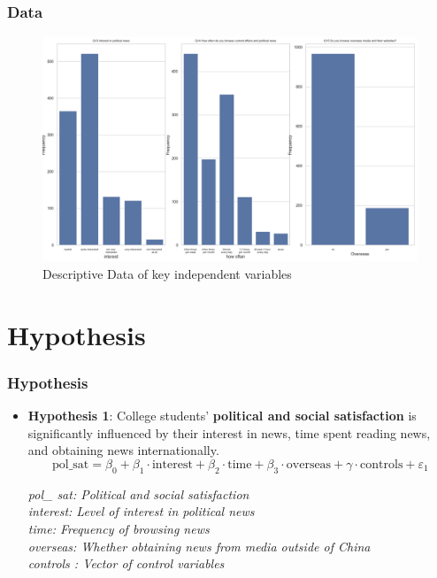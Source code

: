 \documentclass{beamer}
\begin{document}
\begin{frame}
\frametitle{Data}

\begin{figure}
  \centering
  \includegraphics[width=0.8\linewidth]{Distribution2.jpg}
  \caption{Descriptive Data of key independent variables}
  \label{fig:Distribution}
\end{figure}
\end{frame}

\section{Hypothesis}
\begin{frame}
\frametitle{Hypothesis}

\begin{itemize}
    \item<1-> \textbf{Hypothesis 1}: College students' \textbf{political and social satisfaction} is significantly influenced by their interest in news, time spent reading news, and obtaining news internationally.
\begin{equation}
\text{pol\_sat} = \beta_0 + \beta_1 \cdot \text{interest} + \beta_2 \cdot \text{time} + \beta_3 \cdot \text{overseas} + \gamma \cdot \text{controls} + \varepsilon_1
\end{equation}

\textit{\small{pol\_ sat: Political and social satisfaction\\
interest: Level of interest in political news\\
time: Frequency of browsing news\\
overseas: Whether obtaining news from media outside of China\\
controls : Vector of control variables}}
\end{itemize}
\end{frame}
\end{document}
